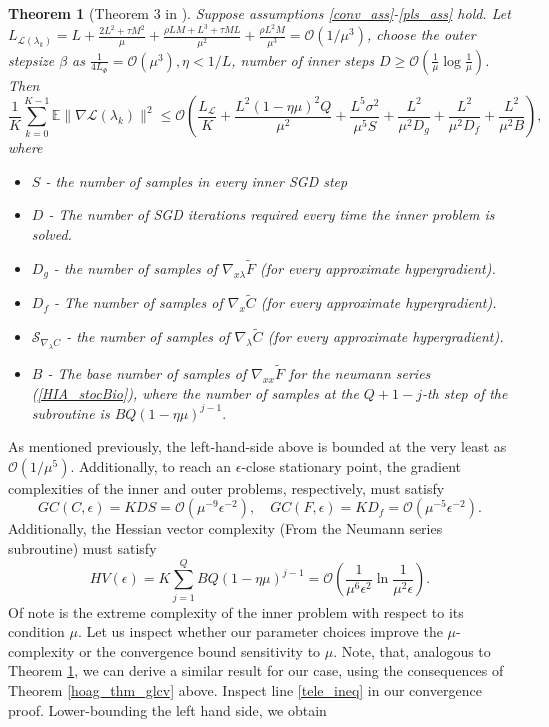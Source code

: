 \documentclass[11pt, twoside]{report}
\newtheorem{theorem}{Theorem}[section]
\begin{document}
\begin{theorem}[Theorem 3 in \cite{ji2021bilevel}] \label{thm3}
    Suppose assumptions \ref{conv_ass}-\ref{pls_ass} hold. Let $L_{\mathcal{L}(\lambda_k)} = L + \frac{2L^2 + \tau M^2}{\mu} + \frac{\rho L M + L^3 + \tau M L}{\mu^2} + \frac{\rho L^2 M}{\mu^3} = \mathcal{O}(1/\mu^3)$, choose the outer stepsize $\beta$ as $\frac{1}{4 L_\Phi} = \mathcal{O}(\mu^3), \eta < 1/L$, number of inner steps $D \geq \mathcal{O}(\frac{1}{\mu} \log{\frac{1}{\mu}})$. Then
    \[\frac{1}{K} \sum_{k=0}^{K-1} \mathbb{E} \|\nabla \mathcal{L} (\lambda_k)\|^2 \leq \mathcal{O}\left( \frac{L_{\mathcal{L}}}{K} + \frac{L^2(1-\eta \mu)^2Q}{\mu^2} + \frac{L^5 \sigma^2}{\mu^5 S} + \frac{L^2}{\mu^2 D_g} + \frac{L^2}{\mu^2 D_f} + \frac{L^2}{
    \mu^2 B} \right),\]
    where
    \begin{itemize}
        \item $S$ - the number of samples in every inner SGD step
        \item $D$ - The number of SGD iterations required every time the inner problem is solved.
        \item $D_g$ - the number of samples of $\nabla_{x\lambda} \tilde{F}$ (for every approximate hypergradient).
        \item $D_f$ - The number of samples of $\nabla_x \tilde{C}$ (for every approximate hypergradient).
        \item $\mathcal{S}_{\nabla_\lambda C}$ - the number of samples of $\nabla_{\lambda} \tilde{C}$ (for every approximate hypergradient).
        \item $B$ - The base number of samples of $\nabla_{xx} \tilde{F}$ for the neumann series (\ref{HIA_stocBio}), where the number of samples at the $Q+1-j$-th step of the subroutine is $BQ(1-\eta\mu)^{j-1}.$
    \end{itemize}
\end{theorem}
As mentioned previously, the left-hand-side above is bounded at the very least as $\mathcal{O}(1 / \mu^5)$. Additionally, to reach an $\epsilon$-close stationary point, the gradient complexities of the inner and outer problems, respectively, must satisfy
\[GC(C,\epsilon) = KDS = \mathcal{O}(\mu^{-9} \epsilon^{-2}), \quad GC(F,\epsilon) = KD_f = \mathcal{O} (\mu^{-5} \epsilon^{-2}). \]
Additionally, the Hessian vector complexity (From the Neumann series subroutine) must satisfy
\[HV(\epsilon) = K \sum_{j=1}^Q B Q(1-\eta \mu)^{j-1} = \mathcal{O}\left(\frac{1}{\mu^6\epsilon^2} \ln \frac{1}{\mu^2\epsilon}\right).\]
Of note is the extreme complexity of the inner problem with respect to its condition $\mu$. Let us inspect whether our parameter choices improve the $\mu$-complexity or the convergence bound sensitivity to $\mu$. Note, that, analogous to Theorem \ref{thm3}, we can derive a similar result for our case, using the consequences of Theorem \ref{hoag_thm_glcv} above. Inspect line \ref{tele_ineq} in our convergence proof. Lower-bounding the left hand side, we obtain
\end{document}

